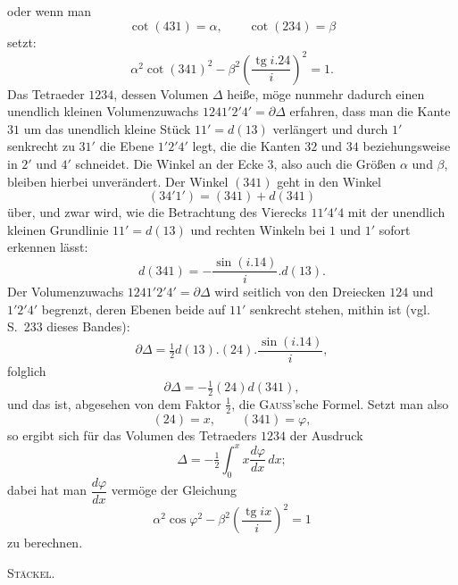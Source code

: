 %
\noindent oder wenn man
\[
\cot(431)=\alpha,\qquad\cot(234)=\beta
\]
setzt:
\[
\alpha^{2}\cot(341)^{2}-\beta^{2}\left(\frac{\operatorname{tg}i.24}{i}\right)^{2}=1.
\]
Das Tetraeder $1234$, dessen Volumen $\Delta$ heiße, möge nunmehr dadurch einen unendlich kleinen Volumenzuwachs $1241'2'4'=\partial\Delta$ erfahren, dass man die Kante $31$ um das unendlich kleine Stück $11'=d(13)$ verlängert und durch $1'$ senkrecht zu $31'$ die Ebene $1'2'4'$ legt, die die Kanten $32$ und $34$ beziehungsweise in $2'$ und $4'$ schneidet. Die Winkel an der Ecke $3$, also auch die Größen $\alpha$ und $\beta$, bleiben hierbei unverändert. Der Winkel $(341)$ geht in den Winkel
\[
(34'1')=(341)+d(341)
\]
über, und zwar wird, wie die Betrachtung des Vierecks $11'4'4$ mit der unendlich kleinen Grundlinie $11'=d(13)$ und rechten Winkeln bei $1$ und $1'$ sofort erkennen lässt:
\[
d(341)=-\frac{\sin(i.14)}{i}.d(13).
\]
Der Volumenzuwachs $1241'2'4'=\partial\Delta$ wird seitlich von den Dreiecken $124$ und $1'2'4'$ begrenzt, deren Ebenen beide auf $11'$ senkrecht stehen, mithin ist (vgl. S.~233 dieses Bandes):
\[
\partial\Delta=\tfrac{1}{2}d(13).(24).\frac{\sin(i.14)}{i},
\]
folglich
\[
\partial\Delta=-\tfrac{1}{2}(24)d(341),
\]
und das ist, abgesehen von dem Faktor $\tfrac{1}{2}$, die \textsc{Gauss}'sche Formel. Setzt man also
\[
(24)=x,\qquad(341)=\varphi,
\]
so ergibt sich für das Volumen des Tetraeders $1234$ der Ausdruck
\[
\Delta=-\tfrac{1}{2}\int_{0}^{x}x\frac{d\varphi}{dx}\,dx;
\]
dabei hat man $\dfrac{d\varphi}{dx}$ vermöge der Gleichung
\[
\alpha^{2}\cos\varphi^{2}-\beta^{2}\left(\frac{\operatorname{tg}ix}{i}\right)^{2}=1
\]
zu berechnen.
\begin{flushright}\textsc{Stäckel.}\end{flushright}
\par\endgroup
